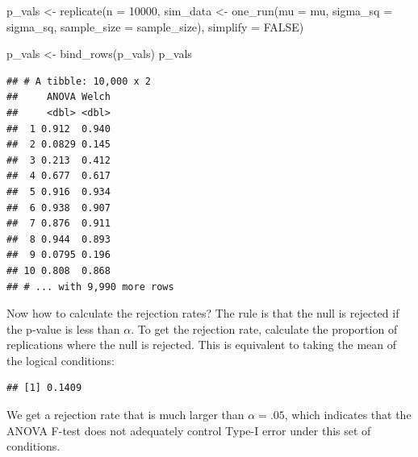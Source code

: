 \documentclass[
]{book}
\newenvironment{Shaded}{\begin{snugshade}}{\end{snugshade}}
\newcommand{\AttributeTok}[1]{\textcolor[rgb]{0.77,0.63,0.00}{#1}}
\newcommand{\ConstantTok}[1]{\textcolor[rgb]{0.00,0.00,0.00}{#1}}
\newcommand{\DecValTok}[1]{\textcolor[rgb]{0.00,0.00,0.81}{#1}}
\newcommand{\FloatTok}[1]{\textcolor[rgb]{0.00,0.00,0.81}{#1}}
\newcommand{\FunctionTok}[1]{\textcolor[rgb]{0.00,0.00,0.00}{#1}}
\newcommand{\NormalTok}[1]{#1}
\newcommand{\OtherTok}[1]{\textcolor[rgb]{0.56,0.35,0.01}{#1}}
\newcommand{\SpecialCharTok}[1]{\textcolor[rgb]{0.00,0.00,0.00}{#1}}
\begin{document}
\begin{Shaded}
\begin{Highlighting}[]
\NormalTok{p\_vals }\OtherTok{\textless{}{-}} \FunctionTok{replicate}\NormalTok{(}\AttributeTok{n =} \DecValTok{10000}\NormalTok{, }
\NormalTok{  sim\_data }\OtherTok{\textless{}{-}} \FunctionTok{one\_run}\NormalTok{(}\AttributeTok{mu =}\NormalTok{ mu, }\AttributeTok{sigma\_sq =}\NormalTok{ sigma\_sq, }\AttributeTok{sample\_size =}\NormalTok{ sample\_size), }
  \AttributeTok{simplify =} \ConstantTok{FALSE}\NormalTok{)}

\NormalTok{p\_vals }\OtherTok{\textless{}{-}} \FunctionTok{bind\_rows}\NormalTok{(p\_vals)}
\NormalTok{p\_vals}
\end{Highlighting}
\end{Shaded}

\begin{verbatim}
## # A tibble: 10,000 x 2
##     ANOVA Welch
##     <dbl> <dbl>
##  1 0.912  0.940
##  2 0.0829 0.145
##  3 0.213  0.412
##  4 0.677  0.617
##  5 0.916  0.934
##  6 0.938  0.907
##  7 0.876  0.911
##  8 0.944  0.893
##  9 0.0795 0.196
## 10 0.808  0.868
## # ... with 9,990 more rows
\end{verbatim}

Now how to calculate the rejection rates? The rule is that the null is rejected if the p-value is less than \(\alpha\). To get the rejection rate, calculate the proportion of replications where the null is rejected. This is equivalent to taking the mean of the logical conditions:

\begin{Shaded}
\end{Shaded}

\begin{verbatim}
## [1] 0.1409
\end{verbatim}

We get a rejection rate that is much larger than \(\alpha = .05\), which indicates that the ANOVA F-test does not adequately control Type-I error under this set of conditions.

\begin{Shaded}
\end{Shaded}
\end{document}
